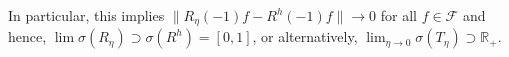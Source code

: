 \documentclass[a4paper,reqno]{amsart}
\numberwithin{equation}{section}
\numberwithin{equation}{section}		%
\numberwithin{figure}{section}			%
\numberwithin{table}{section}				%
\newcommand{\R}{\mathbb{R}}
\newcommand{\ntodo}[1]{\todo[inline, backgroundcolor=blue!20!white, bordercolor=blue]{Niklas: #1}}
\theoremstyle{definition}
\newcommand{\<}{\ensuremath \leq}
\renewcommand{\>}{\ensuremath \geq}
\def\dto{\buildrel\hbox{$\textbf{P}$}\over
\to \!\!\!\!\! \to}
\begin{document}
In particular, this implies  $\lVert R_\eta(-1)f - R^h(-1)f\rVert\rightarrow0$ for all $f \in \mathcal{F}$ and hence, $\lim \sigma(R_\eta)\supset\sigma(R^h) = [0,1]$, or alternatively, $\lim _{\eta\rightarrow 0}\sigma(T_\eta)\supset\R_+$.
\end{document}

